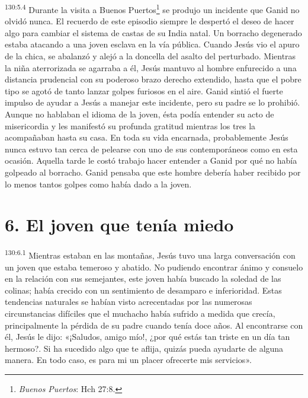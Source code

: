 \par
\textsuperscript{130:5.4} Durante la visita a Buenos Puertos\footnote{\textit{Buenos Puertos}: Hch 27:8.} se produjo un incidente que Ganid no olvidó nunca. El recuerdo de este episodio siempre le despertó el deseo de hacer algo para cambiar el sistema de castas de su India natal. Un borracho degenerado estaba atacando a una joven esclava en la vía pública. Cuando Jesús vio el apuro de la chica, se abalanzó y alejó a la doncella del asalto del perturbado. Mientras la niña aterrorizada se agarraba a él, Jesús mantuvo al hombre enfurecido a una distancia prudencial con su poderoso brazo derecho extendido, hasta que el pobre tipo se agotó de tanto lanzar golpes furiosos en el aire. Ganid sintió el fuerte impulso de ayudar a Jesús a manejar este incidente, pero su padre se lo prohibió. Aunque no hablaban el idioma de la joven, ésta podía entender su acto de misericordia y les manifestó su profunda gratitud mientras los tres la acompañaban hasta su casa. En toda su vida encarnada, probablemente Jesús nunca estuvo tan cerca de pelearse con uno de sus contemporáneos como en esta ocasión. Aquella tarde le costó trabajo hacer entender a Ganid por qué no había golpeado al borracho. Ganid pensaba que este hombre debería haber recibido por lo menos tantos golpes como había dado a la joven.

\section*{6. El joven que tenía miedo}
\par
\textsuperscript{130:6.1} Mientras estaban en las montañas, Jesús tuvo una larga conversación con un joven que estaba temeroso y abatido. No pudiendo encontrar ánimo y consuelo en la relación con sus semejantes, este joven había buscado la soledad de las colinas; había crecido con un sentimiento de desamparo e inferioridad. Estas tendencias naturales se habían visto acrecentadas por las numerosas circunstancias difíciles que el muchacho había sufrido a medida que crecía, principalmente la pérdida de su padre cuando tenía doce años. Al encontrarse con él, Jesús le dijo: «¡Saludos, amigo mío!, ¿por qué estás tan triste en un día tan hermoso?. Si ha sucedido algo que te aflija, quizás pueda ayudarte de alguna manera. En todo caso, es para mi un placer ofrecerte mis servicios».

